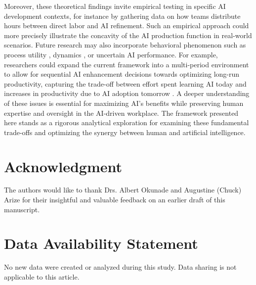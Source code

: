 \documentclass[11pt]{article}
\theoremstyle{definition}
\theoremstyle{remark}
\begin{document}
Moreover, these theoretical findings invite empirical testing in specific AI development contexts, for instance by gathering data on how teams distribute hours between direct labor and AI refinement. Such an empirical approach could more precisely illustrate the concavity of the AI production function in real-world scenarios. Future research may also incorporate behavioral phenomenon such as process utility \citep{frey2005beyond}, dynamics \citep{bellman1952theory}, or uncertain AI performance. For example, researchers could expand the current framework into a multi-period environment to allow for sequential AI enhancement decisions towards optimizing long-run productivity, capturing the trade-off between effort spent learning AI today and increases in productivity due to AI adoption tomorrow \citep{arrow1962economic,argote2011organizational}. A deeper understanding of these issues is essential for maximizing AI’s benefits while preserving human expertise and oversight in the AI-driven workplace. The framework presented here stands as a rigorous analytical exploration for examining these fundamental trade-offs and optimizing the synergy between human and artificial intelligence.

\section*{Acknowledgment}
{\small The authors would like to thank Drs. Albert Okunade and Augustine (Chuck) Arize for their insightful and valuable feedback on an earlier draft of this manuscript.}

\section*{Data Availability Statement}
{\small No new data were created or analyzed during this study. Data sharing is not applicable to this article.}
\end{document}
